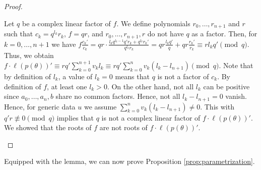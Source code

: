 \begin{proof}
\begin{itemize}
        Let \( q \) be a complex linear factor of \( f \). We define polynomials \( r_0, \dots, r_{n+1} \) and \( r \) such that \( c_k = q^{l_k}r_k \), \( f = q r \), and \( r_0, \dots, r_{n+1}, r \) do not have \( q \) as a factor. Then, for \(  k = 0, \dots, n+1 \) we have
        \( f \frac{c_k'}{c_k} = q r \cdot \frac{l_k q^{l_k - 1} q'r_k +  q^{l_k}r_k'}{q^{l_k}r_k} = q r\frac{l_k q' }{q} + q r\frac{r_k'}{r_k} \equiv rl_k q' \pmod q \).
        Thus, we obtain \( f \cdot \ell(p(\theta))' \equiv rq'\sum_{k=0}^{n + 1} v_k l_k \equiv rq' \sum_{k=0}^{n } v_k(l_k - l_{n+1}) \pmod q \).
        Note that by definition of \( l_k \), a value of \( l_k = 0 \) means that \( q \) is not a factor of \( c_k \). By definition of \( f \), at least one \( l_k > 0 \). On the other hand, not all \( l_k \) can be positive since \( a_0, \dots, a_n, b \) share no common factors. Hence, not all \( l_k - l_{n+1} = 0 \) vanish. Hence, for generic data \( u \) we assume \( \sum_{k=0}^{n } v_k(l_k - l_{n+1}) \neq 0 \). This with \( q'r \not \equiv 0 \pmod q \) implies that \( q \) is not a complex linear factor of \( f \cdot \ell(p(\theta))' \). We showed that the roots of \( f \) are not roots of \( f \cdot \ell(p(\theta))' \).
    \end{itemize}
\end{proof}

Equipped with the lemma, we can now prove Proposition \ref{prop:parametrization}.

